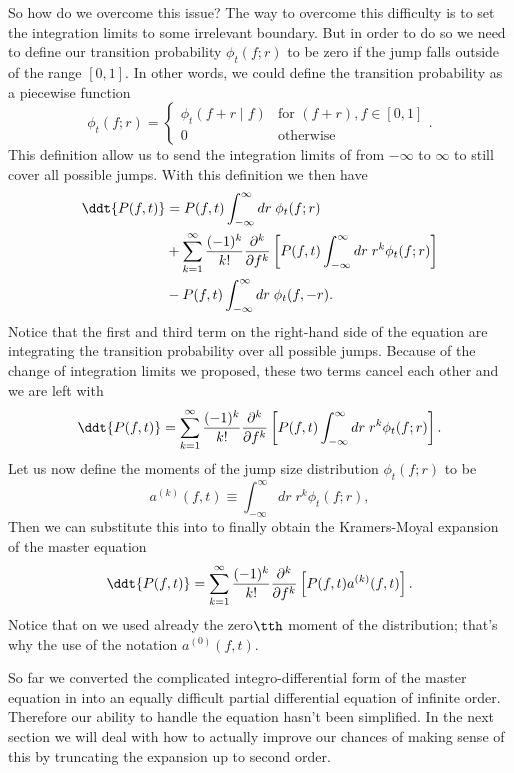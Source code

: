 So how do we overcome this issue? The way to overcome this difficulty is to
set the integration limits to some irrelevant boundary. But in order to do so
we need to define our transition probability $\phi_t(f; r)$ to be zero if the
jump falls outside of the range $[0, 1]$. In other words, we could define the
transition probability as a piecewise function
\begin{equation}
  \phi_t(f; r) =
  \begin{cases}
    \phi_t(f + r \mid f)& \text{for } (f + r), f \in [0, 1] \\
    0& \text{otherwise}
  \end{cases}.
\end{equation}
This definition allow us to send the integration limits of
 from $-\infty$ to $\infty$ to still cover all possible
jumps. With this definition we then have
\begin{equation}
  \begin{split}
    \ddt{P(f, t)} &= P(f, t)\int^\infty_{- \infty} dr \; \phi_t(f; r) \\
    &+
    \sum_{k=1}^\infty {(-1)^k \over k!} {\partial^k \over \partial f^k}
    \left[
    P(f, t) \int_{-\infty}^\infty dr \; r^k \phi_t(f; r)
    \right] \\
    &-
    P(f, t) \int_{-\infty}^\infty dr \; \phi_t(f, -r).
  \end{split}
\end{equation}
Notice that the first and third term on the right-hand side of the equation are
integrating the transition probability over all possible jumps. Because of the
change of integration limits we proposed, these two terms cancel each other and
we are left with
\begin{equation}
  \ddt{P(f, t)} = \sum_{k=1}^\infty {(-1)^k \over k!}
  {\partial^k \over \partial f^k}
  \left[
  P(f, t) \int_{-\infty}^\infty dr \; r^k \phi_t(f; r)
  \right].
  \label{eq_almost_km}
\end{equation}
Let us now define the moments of the jump size distribution $\phi_t(f; r)$ to
be
\begin{equation}
  a^{(k)}(f, t) \equiv \int_{-\infty}^\infty dr \; r^k \phi_t(f; r),
  \label{eq_jump_mom}
\end{equation}
Then we can substitute this into  to finally obtain the
Kramers-Moyal expansion of the master equation
\begin{equation}
  \ddt{P(f, t)} = \sum_{k=1}^\infty {(-1)^k \over k!}
  {\partial^k \over \partial f^k}
  \left[
  P(f, t) a^{(k)}(f, t)
  \right].
  \label{eq_km_expansion}
\end{equation}
Notice that on  we used already the zero$\tth$
moment of the distribution; that's why the use of the notation $a^{(0)}(f, t)$.

So far we converted the complicated integro-differential form of the master
equation in  into an equally difficult partial
differential equation of infinite order. Therefore our ability to handle the
equation hasn't been simplified. In the next section we will deal with how to
actually improve our chances of making sense of this by truncating the
expansion up to second order.
